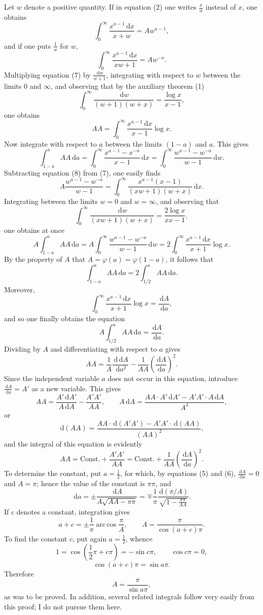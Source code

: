 \documentclass[11pt]{article}
\newcommand{\dd}{\,\mathrm d}
\newcommand{\arccosop}{\operatorname{arc\,cos}}
\begin{document}
Let $w$ denote a positive quantity. If in equation (2) one writes $\frac{x}{w}$ instead of $x$, one obtains
\begin{equation}
\int_0^\infty\frac{x^{a-1}\dd x}{x+w}=Aw^{a-1},
\tag{7}
\end{equation}
and if one puts $\frac1w$ for $w$,
\begin{equation}
\int_0^\infty\frac{x^{a-1}\dd x}{xw+1}=Aw^{-a}.
\tag{8}
\end{equation}
Multiplying equation (7) by $\frac{\dd w}{w+1}$, integrating with respect to $w$ between the limits $0$ and $\infty$, and observing that by the auxiliary theorem (1)
\[
\int_0^\infty\frac{\dd w}{(w+1)(w+x)}=\frac{\log x}{x-1},
\]
one obtains
\[
AA=\int_0^\infty\frac{x^{a-1}\dd x}{x-1}\log x.
\]
Now integrate with respect to $a$ between the limits $(1-a)$ and $a$. This gives
\[
\int_{1-a}^{a}AA\dd a
=\int_0^\infty\frac{x^{a-1}-x^{-a}}{x-1}\dd x
=\int_0^\infty\frac{w^{a-1}-w^{-a}}{w-1}\dd w.
\]
Subtracting equation (8) from (7), one easily finds
\[
A\frac{w^{a-1}-w^{-a}}{w-1}
=\int_0^\infty\frac{x^{a-1}(x-1)}{(xw+1)(w+x)}\dd x.
\]
Integrating between the limits $w=0$ and $w=\infty$, and observing that
\[
\int_0^\infty\frac{\dd w}{(xw+1)(w+x)}=\frac{2\log x}{xx-1},
\]
one obtains at once
\[
A\int_{1-a}^{a}AA\dd a
=A\int_0^\infty\frac{w^{a-1}-w^{-a}}{w-1}\dd w
=2\int_0^\infty\frac{x^{a-1}\dd x}{x+1}\log x.
\]
By the property of $A$ that $A=\varphi(a)=\varphi(1-a)$, it follows that
\[
\int_{1-a}^{a}AA\dd a=2\int_{1/2}^{a}AA\dd a.
\]
Moreover,
\[
\int_0^\infty\frac{x^{a-1}\dd x}{x+1}\log x=\frac{\dd A}{\dd a},
\]
and so one finally obtains the equation
\[
A\int_{1/2}^{a}AA\dd a=\frac{\dd A}{\dd a}.
\]
Dividing by $A$ and differentiating with respect to $a$ gives
\[
AA=\frac1A\frac{\dd\dd A}{\dd a^2}-\frac1{AA}\left(\frac{\dd A}{\dd a}\right)^2.
\]
Since the independent variable $a$ does not occur in this equation, introduce $\frac{\dd A}{\dd a}=A'$ as a new variable. This gives
\[
AA=\frac{A'\dd A'}{A\dd A}-\frac{A'A'}{AA},\qquad
A\dd A=\frac{AA\cdot A'\dd A'-A'A'\cdot A\dd A}{A^4},
\]
or
\[
\dd(AA)=\frac{AA\cdot\dd(A'A')-A'A'\cdot\dd(AA)}{(AA)^2},
\]
and the integral of this equation is evidently
\[
AA=\mathrm{Const.}+\frac{A'A'}{AA}
=\mathrm{Const.}+\frac1{AA}\left(\frac{\dd A}{\dd a}\right)^2.
\]
To determine the constant, put $a=\frac12$, for which, by equations (5) and (6), $\frac{\dd A}{\dd a}=0$ and $A=\pi$; hence the value of the constant is $\pi\pi$, and
\[
\dd a=\pm\frac{\dd A}{A\sqrt{AA-\pi\pi}}
=\mp\frac1\pi\frac{\dd(\pi/A)}{\sqrt{1-\frac{\pi\pi}{AA}}}.
\]
If $c$ denotes a constant, integration gives
\[
a+c=\pm\frac1\pi\arccosop\frac\pi A,
\qquad
A=\frac{\pi}{\cos(a+c)\pi}.
\]
To find the constant $c$, put again $a=\frac12$, whence
\[
1=\cos\left(\frac12\pi+c\pi\right)=-\sin c\pi,
\qquad \cos c\pi=0,
\]
\[
\cos(a+c)\pi=\sin a\pi.
\]
Therefore
\[
A=\frac\pi{\sin a\pi},
\]
as was to be proved. In addition, several related integrals follow very easily from this proof; I do not pursue them here.
\end{document}
